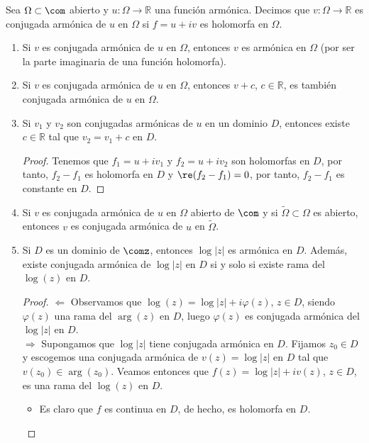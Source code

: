 \begin{defi}
Sea $\Omega \subset \com$ abierto y $u : \Omega \longrightarrow \mathbb{R}$ una función armónica. Decimos que $v : \Omega \longrightarrow \mathbb{R}$ es conjugada armónica de $u$ en $\Omega$ si $f = u + iv$ es holomorfa en $\Omega$.
\end{defi}

\begin{ejemplo}
\begin{enumerate}
    \item Si $v$ es conjugada armónica de $u$ en $\Omega$, entonces $v$ es armónica en $\Omega$ (por ser la parte imaginaria de una función holomorfa).
    \item Si $v$ es conjugada armónica de $u$ en $\Omega$, entonces $v + c$, $c \in \mathbb{R}$, es también conjugada armónica de $u$ en $\Omega$.
    \item Si $v_1$ y $v_2$ son conjugadas armónicas de $u$ en un dominio $D$, entonces existe $c \in \mathbb{R}$ tal que $v_2 = v_1 + c$ en $D$.
    \begin{proof}
    Tenemos que $f_1 = u +iv_1$ y $f_2 = u + iv_2$ son holomorfas en $D$, por tanto, $f_2 - f_1$ es holomorfa en $D$ y $\re(f_2 - f_1) = 0$, por tanto, $f_2 - f_1$ es constante en $D$.
    \end{proof}
    \item Si $v$ es conjugada armónica de $u$ en $\Omega$ abierto de $\com$ y si $\widetilde{\Omega} \subset \Omega$ es abierto, entonces $v$ es conjugada armónica de $u$ en $\widetilde{\Omega}$.
    \item Si $D$ es un dominio de $\comz$, entonces $\log|z|$ es armónica en $D$. Además, existe conjugada armónica de $\log|z|$ en $D$ si y solo si existe rama del $\log(z)$ en $D$.
    \begin{proof}
    $\boxed{\Longleftarrow}$ Observamos que $\log(z) = \log|z| + i\varphi(z)$, $z \in D$, siendo $\varphi(z)$ una rama del $\arg(z)$ en $D$, luego $\varphi(z)$ es conjugada armónica del $\log|z|$ en $D$.
    \\
    \newline
    $\boxed{\Longrightarrow}$ Supongamos que $\log|z|$ tiene conjugada armónica en $D$. Fijamos $z_0 \in D$ y escogemos una conjugada armónica de $v(z) = \log|z|$ en $D$ tal que $v(z_0) \in \arg(z_0)$. Veamos entonces que $f(z) = \log|z| + iv(z)$, $z \in D$, es una rama del $\log(z)$ en $D$.
    \begin{itemize}
        \item Es claro que $f$ es continua en $D$, de hecho, es holomorfa en $D$.

\end{itemize}
\end{proof}
\end{enumerate}
\end{ejemplo}
